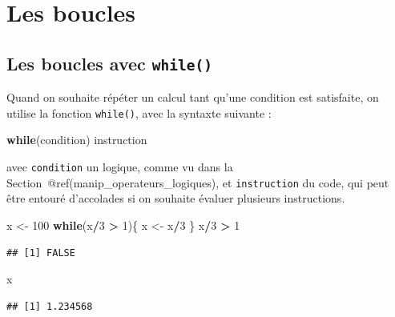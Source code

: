 \documentclass[
  11pt,
]{book}
\newenvironment{Shaded}{\begin{snugshade}}{\end{snugshade}}
\newcommand{\ControlFlowTok}[1]{\textcolor[rgb]{0.13,0.29,0.53}{\textbf{#1}}}
\newcommand{\DecValTok}[1]{\textcolor[rgb]{0.00,0.00,0.81}{#1}}
\newcommand{\NormalTok}[1]{#1}
\newcommand{\OperatorTok}[1]{\textcolor[rgb]{0.81,0.36,0.00}{\textbf{#1}}}
\newcommand{\StringTok}[1]{\textcolor[rgb]{0.31,0.60,0.02}{#1}}
\numberwithin{equation}{section}
\numberwithin{countremarque}{section}
\begin{document}
\hypertarget{boucles_boucles}{%
\section{Les boucles}\label{boucles_boucles}}

\hypertarget{boucles_boucles_while}{%
\subsection{\texorpdfstring{Les boucles avec \texttt{while()}}{Les boucles avec while()}}\label{boucles_boucles_while}}

Quand on souhaite répéter un calcul tant qu'une condition est satisfaite, on utilise la fonction \texttt{while()}, avec la syntaxte suivante :

\begin{Shaded}
\begin{Highlighting}[]
\ControlFlowTok{while}\NormalTok{(condition) instruction}
\end{Highlighting}
\end{Shaded}

avec \texttt{condition} un logique, comme vu dans la Section~@ref(manip\_operateurs\_logiques), et \texttt{instruction} du code, qui peut être entouré d'accolades si on souhaite évaluer plusieurs instructions.

\begin{Shaded}
\begin{Highlighting}[]
\NormalTok{x \textless{}{-}}\StringTok{ }\DecValTok{100}
\ControlFlowTok{while}\NormalTok{(x}\OperatorTok{/}\DecValTok{3} \OperatorTok{\textgreater{}}\StringTok{ }\DecValTok{1}\NormalTok{)\{}
\NormalTok{  x \textless{}{-}}\StringTok{ }\NormalTok{x}\OperatorTok{/}\DecValTok{3}
\NormalTok{\}}
\NormalTok{x}\OperatorTok{/}\DecValTok{3} \OperatorTok{\textgreater{}}\StringTok{ }\DecValTok{1}
\end{Highlighting}
\end{Shaded}

\begin{lstlisting}
## [1] FALSE
\end{lstlisting}

\begin{Shaded}
\begin{Highlighting}[]
\NormalTok{x}
\end{Highlighting}
\end{Shaded}

\begin{lstlisting}
## [1] 1.234568
\end{lstlisting}
\end{document}
